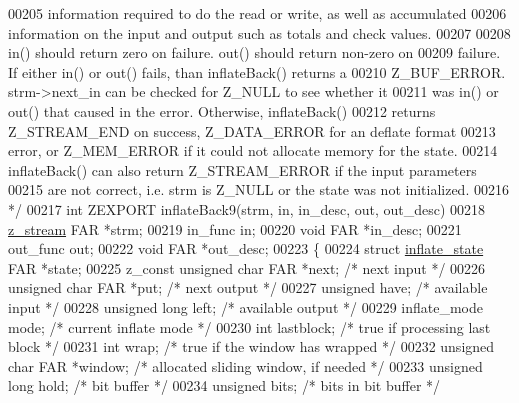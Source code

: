 \begin{DoxyCode}
{{{{00205 \textcolor{comment}{   information required to do the read or write, as well as accumulated}
00206 \textcolor{comment}{   information on the input and output such as totals and check values.}
00207 \textcolor{comment}{}
00208 \textcolor{comment}{   in() should return zero on failure.  out() should return non-zero on}
00209 \textcolor{comment}{   failure.  If either in() or out() fails, than inflateBack() returns a}
00210 \textcolor{comment}{   Z\_BUF\_ERROR.  strm->next\_in can be checked for Z\_NULL to see whether it}
00211 \textcolor{comment}{   was in() or out() that caused in the error.  Otherwise,  inflateBack()}
00212 \textcolor{comment}{   returns Z\_STREAM\_END on success, Z\_DATA\_ERROR for an deflate format}
00213 \textcolor{comment}{   error, or Z\_MEM\_ERROR if it could not allocate memory for the state.}
00214 \textcolor{comment}{   inflateBack() can also return Z\_STREAM\_ERROR if the input parameters}
00215 \textcolor{comment}{   are not correct, i.e. strm is Z\_NULL or the state was not initialized.}
00216 \textcolor{comment}{ */}
00217 \textcolor{keywordtype}{int} ZEXPORT inflateBack9(strm, in, in\_desc, out, out\_desc)
00218 \hyperlink{structz__stream__s}{z\_stream} FAR *strm;
00219 in\_func in;
00220 \textcolor{keywordtype}{void} FAR *in\_desc;
00221 out\_func out;
00222 \textcolor{keywordtype}{void} FAR *out\_desc;
00223 \{
00224     \textcolor{keyword}{struct }\hyperlink{structinflate__state}{inflate\_state} FAR *state;
00225     z\_const \textcolor{keywordtype}{unsigned} \textcolor{keywordtype}{char} FAR *next;    \textcolor{comment}{/* next input */}
00226     \textcolor{keywordtype}{unsigned} \textcolor{keywordtype}{char} FAR *put;     \textcolor{comment}{/* next output */}
00227     \textcolor{keywordtype}{unsigned} have;              \textcolor{comment}{/* available input */}
00228     \textcolor{keywordtype}{unsigned} \textcolor{keywordtype}{long} left;         \textcolor{comment}{/* available output */}
00229     inflate\_mode mode;          \textcolor{comment}{/* current inflate mode */}
00230     \textcolor{keywordtype}{int} lastblock;              \textcolor{comment}{/* true if processing last block */}
00231     \textcolor{keywordtype}{int} wrap;                   \textcolor{comment}{/* true if the window has wrapped */}
00232     \textcolor{keywordtype}{unsigned} \textcolor{keywordtype}{char} FAR *window;  \textcolor{comment}{/* allocated sliding window, if needed */}
00233     \textcolor{keywordtype}{unsigned} \textcolor{keywordtype}{long} hold;         \textcolor{comment}{/* bit buffer */}
00234     \textcolor{keywordtype}{unsigned} bits;              \textcolor{comment}{/* bits in bit buffer */}
}}}}
\end{DoxyCode}
